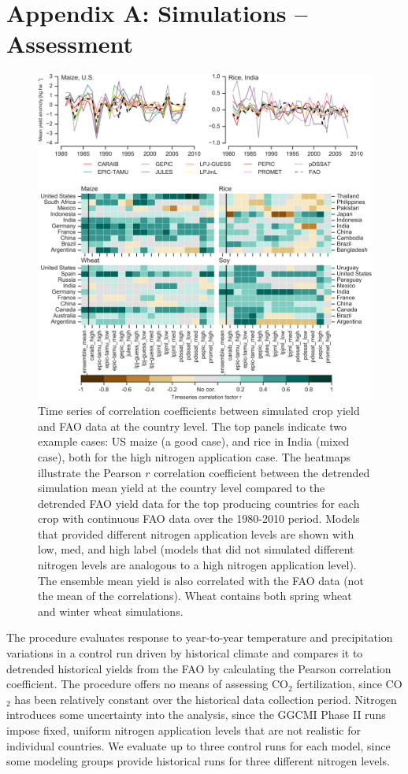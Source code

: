 \documentclass[preprint, 5p, times, twocolumn]{elsarticle}
\begin{document}
\section{Appendix A: Simulations -- Assessment}
\label{A:1}
\begin{figure}[!hb]
    \centering
    \includegraphics[width=0.95\linewidth]{figures/Agformet_validation.png}
    \caption{Time series of correlation coefficients between simulated crop yield and FAO data \citep{FAOSTAT} at the country level. The top panels indicate two example cases: US maize (a good case), and rice in India (mixed case), both for the high nitrogen application case. The heatmaps illustrate the Pearson $r$ correlation coefficient between the detrended simulation mean yield at the country level compared to the detrended FAO yield data for the top producing countries for each crop with continuous FAO data over the 1980-2010 period. Models that provided different nitrogen application levels are shown with low, med, and high label (models that did not simulated different nitrogen levels are analogous to a high nitrogen application level). The ensemble mean yield is also correlated with the FAO data (not the mean of the correlations). Wheat contains both spring wheat and winter wheat simulations.}
    \label{fig:simulation_val}
\end{figure}

The \citet{muller_global_2017} procedure evaluates response to year-to-year temperature and precipitation variations in a control run driven by historical climate and compares it to detrended historical yields from the FAO \citep{FAOSTAT} by calculating the Pearson correlation coefficient.  The procedure offers no means of assessing CO$_2$ fertilization, since CO$_2$ has been relatively constant over the historical data collection period. Nitrogen introduces some uncertainty into the analysis, since the GGCMI Phase II runs impose fixed, uniform nitrogen application levels that are not realistic for individual countries. We evaluate up to three control runs for each model, since some modeling groups provide historical runs for three different nitrogen levels. 
\end{document}
